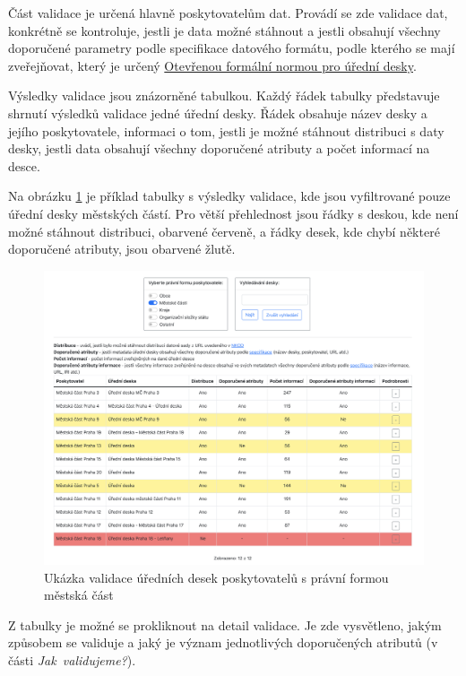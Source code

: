 Část validace je určená hlavně poskytovatelům dat. Provádí se zde
validace dat, konkrétně se kontroluje, jestli je data možné stáhnout a
jestli obsahují všechny doporučené parametry podle specifikace datového
formátu, podle kterého se mají zveřejňovat, který je určený
\href{https://ofn.gov.cz/úřední-desky/2021-07-20/}{Otevřenou formální
normou pro úřední desky}.

Výsledky validace jsou znázorněné tabulkou. Každý řádek tabulky
představuje shrnutí výsledků validace jedné úřední desky. Řádek obsahuje
název desky a jejího poskytovatele, informaci o tom, jestli je možné
stáhnout distribuci s daty desky, jestli data obsahují všechny
doporučené atributy a počet informací na desce.

Na obrázku \ref{fig:screen-validace} je příklad tabulky s výsledky validace, kde jsou vyfiltrované pouze
úřední desky městských částí. Pro větší přehlednost jsou řádky s deskou,
kde není možné stáhnout distribuci, obarvené červeně, a řádky desek, kde
chybí některé doporučené atributy, jsou obarvené žlutě.

\begin{figure}
\centering
\includegraphics[width=\textwidth]{cs/obrazky/screenshots/validace.png}
\caption{Ukázka validace úředních desek poskytovatelů s právní formou městská část}
\label{fig:screen-validace}
\end{figure}

Z tabulky je možné se prokliknout na detail validace. Je zde vysvětleno,
jakým způsobem se validuje a jaký je význam jednotlivých doporučených
atributů (v části \textit{Jak\ validujeme?}).

